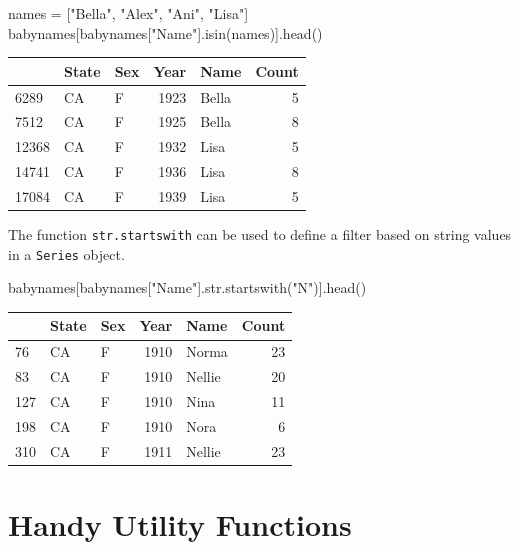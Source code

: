 \documentclass[
  letterpaper,
  DIV=11,
  numbers=noendperiod]{scrreprt}
\newenvironment{Shaded}{\begin{snugshade}}{\end{snugshade}}
\newcommand{\BuiltInTok}[1]{\textcolor[rgb]{0.00,0.23,0.31}{#1}}
\newcommand{\NormalTok}[1]{\textcolor[rgb]{0.00,0.23,0.31}{#1}}
\newcommand{\OperatorTok}[1]{\textcolor[rgb]{0.37,0.37,0.37}{#1}}
\newcommand{\StringTok}[1]{\textcolor[rgb]{0.13,0.47,0.30}{#1}}
\begin{document}
\begin{Shaded}
\begin{Highlighting}[]
\NormalTok{names }\OperatorTok{=}\NormalTok{ [}\StringTok{"Bella"}\NormalTok{, }\StringTok{"Alex"}\NormalTok{, }\StringTok{"Ani"}\NormalTok{, }\StringTok{"Lisa"}\NormalTok{]}
\NormalTok{babynames[babynames[}\StringTok{"Name"}\NormalTok{].isin(names)].head()}
\end{Highlighting}
\end{Shaded}

\begin{tabular}{lllrlr}
\toprule
{} & State & Sex &  Year &   Name &  Count \\
\midrule
6289  &    CA &   F &  1923 &  Bella &      5 \\
7512  &    CA &   F &  1925 &  Bella &      8 \\
12368 &    CA &   F &  1932 &   Lisa &      5 \\
14741 &    CA &   F &  1936 &   Lisa &      8 \\
17084 &    CA &   F &  1939 &   Lisa &      5 \\
\bottomrule
\end{tabular}

The function \texttt{str.startswith} can be used to define a filter
based on string values in a \texttt{Series} object.

\begin{Shaded}
\begin{Highlighting}[]
\NormalTok{babynames[babynames[}\StringTok{"Name"}\NormalTok{].}\BuiltInTok{str}\NormalTok{.startswith(}\StringTok{"N"}\NormalTok{)].head()}
\end{Highlighting}
\end{Shaded}

\begin{tabular}{lllrlr}
\toprule
{} & State & Sex &  Year &    Name &  Count \\
\midrule
76  &    CA &   F &  1910 &   Norma &     23 \\
83  &    CA &   F &  1910 &  Nellie &     20 \\
127 &    CA &   F &  1910 &    Nina &     11 \\
198 &    CA &   F &  1910 &    Nora &      6 \\
310 &    CA &   F &  1911 &  Nellie &     23 \\
\bottomrule
\end{tabular}

\hypertarget{handy-utility-functions}{%
\section{Handy Utility Functions}\label{handy-utility-functions}}
\end{document}
